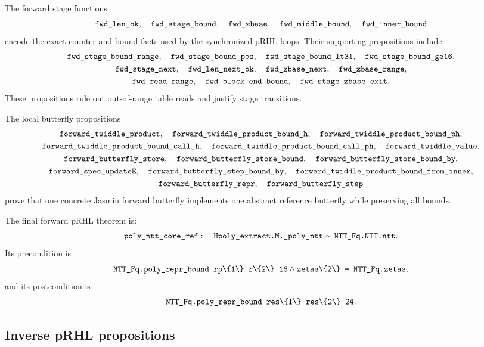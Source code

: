 \documentclass[11pt]{article}
\newcommand{\ec}[1]{\texttt{\detokenize{#1}}}
\begin{document}
The forward stage functions
\[
  \ec{fwd_len_ok},\quad
  \ec{fwd_stage_bound},\quad
  \ec{fwd_zbase},\quad
  \ec{fwd_middle_bound},\quad
  \ec{fwd_inner_bound}
\]
encode the exact counter and bound facts used by the synchronized pRHL loops.
Their supporting propositions include:
\[
\begin{gathered}
  \ec{fwd_stage_bound_range},\quad
  \ec{fwd_stage_bound_pos},\quad
  \ec{fwd_stage_bound_lt31},\quad
  \ec{fwd_stage_bound_ge16},\\
  \ec{fwd_stage_next},\quad
  \ec{fwd_len_next_ok},\quad
  \ec{fwd_zbase_next},\quad
  \ec{fwd_zbase_range},\\
  \ec{fwd_read_range},\quad
  \ec{fwd_block_end_bound},\quad
  \ec{fwd_stage_zbase_exit}.
\end{gathered}
\]
These propositions rule out out-of-range table reads and justify stage
transitions.

The local butterfly propositions
\[
\begin{gathered}
  \ec{forward_twiddle_product},\quad
  \ec{forward_twiddle_product_bound_h},\quad
  \ec{forward_twiddle_product_bound_ph},\\
  \ec{forward_twiddle_product_bound_call_h},\quad
  \ec{forward_twiddle_product_bound_call_ph},\quad
  \ec{forward_twiddle_value},\\
  \ec{forward_butterfly_store},\quad
  \ec{forward_butterfly_store_bound},\quad
  \ec{forward_butterfly_store_bound_by},\\
  \ec{forward_spec_updateE},\quad
  \ec{forward_butterfly_step_bound_by},\quad
  \ec{forward_twiddle_product_bound_from_inner},\\
  \ec{forward_butterfly_repr},\quad
  \ec{forward_butterfly_step}
\end{gathered}
\]
prove that one concrete Jasmin forward butterfly implements one abstract
reference butterfly while preserving all bounds.

The final forward pRHL theorem is:
\[
  \ec{poly_ntt_core_ref}:
  \quad
  \ec{Hpoly_extract.M._poly_ntt}
  \sim
  \ec{NTT_Fq.NTT.ntt}.
\]
Its precondition is
\[
  \ec{NTT_Fq.poly_repr_bound rp\{1\} r\{2\} 16}
  \land
  \ec{zetas\{2\} = NTT_Fq.zetas},
\]
and its postcondition is
\[
  \ec{NTT_Fq.poly_repr_bound res\{1\} res\{2\} 24}.
\]

\subsection{Inverse pRHL propositions}
\end{document}
